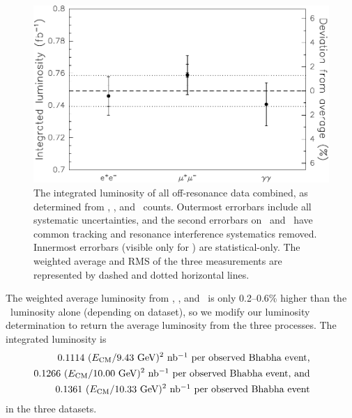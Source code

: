 \documentclass{cornell}
\begin{document}
\begin{figure}[p]
  \begin{center}
    \includegraphics[width=\linewidth]{plots/comparelumis}
  \end{center}
  \caption[Integrated luminosity in \ee, \mumu, and \gamgam\
  measurements]{\label{comparelumis} The integrated luminosity of all
  off-resonance data combined, as determined from \ee, \mumu, and
  \gamgam\ counts.  Outermost errorbars include all systematic
  uncertainties, and the second errorbars on \ee\ and \mumu\ have
  common tracking and resonance interference systematics removed.
  Innermost errorbars (visible only for \mumu) are statistical-only.
  The weighted average and RMS of the three measurements are
  represented by dashed and dotted horizontal lines.}
\end{figure}

The weighted average luminosity from \ee, \mumu, and \gamgam\ is only
0.2--0.6\% higher than the \ee\ luminosity alone (depending on
dataset), so we modify our luminosity determination to return the
average luminosity from the three processes.  The integrated
luminosity is
\begin{eqnarray}
  \mbox{\hspace{-1 cm}} && 0.1114 \mbox{ } (E_\subs{CM}/\mbox{9.43~GeV})^2 \mbox{ nb\inv\ per observed Bhabha event,} \\
  \mbox{\hspace{-1 cm}} && 0.1266 \mbox{ } (E_\subs{CM}/\mbox{10.00~GeV})^2 \mbox{ nb\inv\ per observed Bhabha event, and} \\
  \mbox{\hspace{-1 cm}} && 0.1361 \mbox{ } (E_\subs{CM}/\mbox{10.33~GeV})^2 \mbox{ nb\inv\ per observed Bhabha event}
\end{eqnarray}
in the three datasets.
\end{document}
